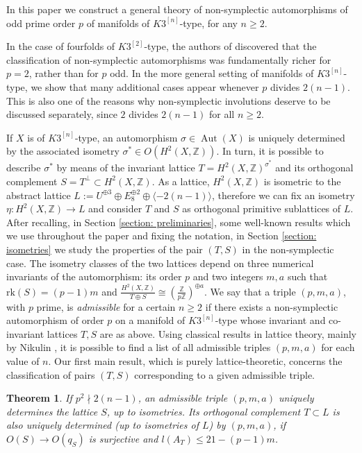 \documentclass{amsart}
\newtheorem{theorem}{Theorem}[section]
\theoremstyle{definition}
\newcommand{\ra}{\rightarrow}
\newcommand{\IZ}{\mathbb{Z}}
\newcommand{\coloneqq}{:=}
\newcommand{\rk}{\mathrm{rk}}
\newcommand{\hsk}{K3^{\left[2\right]}}
\newcommand{\hskn}{K3^{\left[n\right]}}
\DeclareMathOperator{\aut}{Aut}
\begin{document}
In this paper we construct a general theory of non-symplectic automorphisms of odd prime order $p$ of manifolds of $\hskn$-type, for any $n \geq 2$.  

In the case of fourfolds of $\hsk$-type, the authors of \cite{bcs} discovered that the classification of non-symplectic automorphisms was fundamentally richer for $p=2$, rather than for $p$ odd. In the more general setting of manifolds of $\hskn$-type, we show that many additional cases appear whenever $p$ divides $2(n-1)$. This is also one of the reasons why non-symplectic involutions deserve to be discussed separately, since $2$ divides $2(n-1)$ for all $n \geq 2$.

If $X$ is of $\hskn$-type, an automorphism $\sigma \in \aut(X)$ is uniquely determined by the associated isometry $\sigma^* \in O(H^2(X, \IZ))$. In turn, it is possible to describe $\sigma^*$ by means of the invariant lattice $T = H^2(X, \IZ)^{\sigma^*}$ and its orthogonal complement $S = T^ \perp \subset H^2(X, \IZ)$. As a lattice, $H^2(X, \IZ)$ is isometric to the abstract lattice $L \coloneqq U^{\oplus 3} \oplus E_8^{\oplus 2} \oplus \langle -2(n-1) \rangle$, therefore we can fix an isometry $\eta: H^2(X, \IZ) \ra L$ and consider $T$ and $S$ as orthogonal primitive sublattices of $L$. After recalling, in Section \ref{section: preliminaries}, some well-known results which we use throughout the paper and fixing the notation, in Section \ref{section: isometries} we study the properties of the pair $(T, S)$ in the non-symplectic case. The isometry classes of the two lattices depend on three numerical invariants of the automorphism: its order $p$ and two integers $m,a$ such that $\rk(S) = (p-1)m$ and $\frac{H^2(X, \IZ)}{T \oplus S} \cong \left( \frac{\IZ}{p \IZ} \right)^{\oplus a}$. We say that a triple $(p,m,a)$, with $p$ prime, is \emph{admissible} for a certain $n \geq 2$ if there exists a non-symplectic automorphism of order $p$ on a manifold of $\hskn$-type whose invariant and co-invariant lattices $T,S$ are as above. Using classical results in lattice theory, mainly by Nikulin \cite{nikulin}, it is possible to find a list of all admissible triples $(p,m,a)$ for each value of $n$. Our first main result, which is purely lattice-theoretic, concerns the classification of pairs $(T,S)$ corresponding to a given admissible triple.

\begin{theorem}\label{intro: thm adm triples}
If $p^2 \nmid 2(n-1)$, an admissible triple $(p,m,a)$ uniquely determines the lattice $S$, up to isometries. Its orthogonal complement $T \subset L$ is also uniquely determined (up to isometries of $L$) by $(p,m,a)$, if $O(S)\ra O(q_S)$ is surjective and $l(A_T) \leq 21 - (p-1)m$.
\end{theorem}
 
\end{document}
